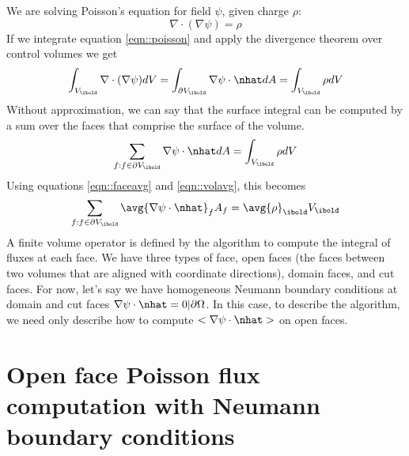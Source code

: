 \documentclass{article}
\begin{document}
We are solving Poisson's equation for field $\psi$, given charge $\rho$:
\begin{equation}
  \nabla \cdot (\nabla \psi) = \rho
  \label{eqn::poisson}
\end{equation}
If we integrate equation \ref{eqn::poisson} and apply the divergence theorem 
over control volumes we get
\begin{equation}
\int_{V_\ibold} \nabla \cdot (\nabla \psi ) dV = \int_{\partial
  V_\ibold} \nabla \psi\cdot \nhat  dA = \int_{V_\ibold} \rho dV
\end{equation}
Without approximation, we can say that the surface integral can be
computed by a sum over the faces that comprise the surface of the
volume.
\begin{equation}
\sum_{f: f \in \partial V_\ibold} \nabla \psi \cdot \nhat dA = \int_{V_\ibold} \rho dV
\end{equation}
Using equations \ref{eqn::faceavg} and \ref{eqn::volavg}, this becomes 
\begin{equation}
\sum_{f: f \in \partial V_\ibold} \avg{\nabla \psi \cdot \nhat}_f A_f
= \avg{\rho}_\ibold V_\ibold
\label{eqn::discretePoisson}
\end{equation}
A finite volume operator is defined by the algorithm to compute the
integral of fluxes at each face.  We have three types of face, open
faces (the faces between two volumes that are aligned with coordinate
directions), domain faces, and cut faces.  For now, let's say we have
homogeneous Neumann boundary conditions at domain and cut faces
$\nabla \psi \cdot \nhat = 0 |\partial \Omega$.  In this case, to
describe the algorithm, we need only describe how to compute 
$<\nabla\psi \cdot \nhat>$ on open faces.

\section{Open face Poisson flux computation with Neumann boundary conditions}
\end{document}
